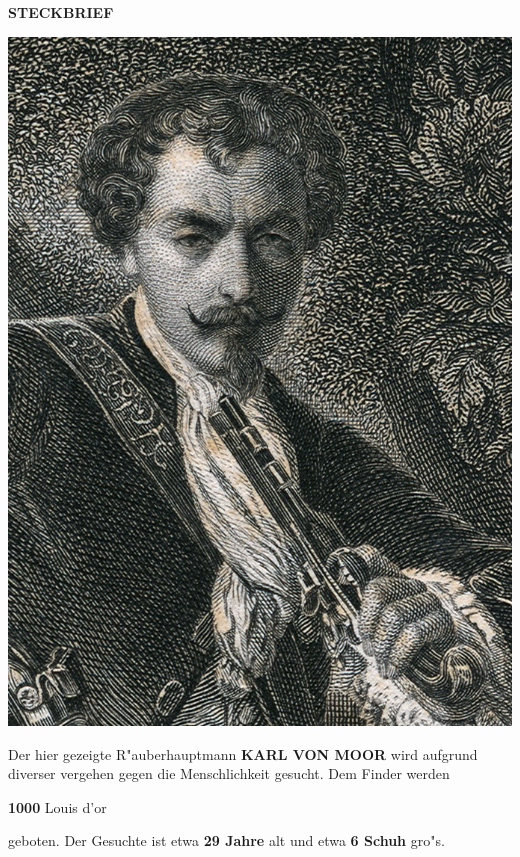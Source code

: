 \begin{center}
\begin{huge}
\textbf{\uppercase{Steckbrief}}
\end{huge}
\end{center}

\begin{center}
\includegraphics[scale=2.5]{karl}
\end{center}

\begin{center}
Der hier gezeigte  R"auberhauptmann \textbf{\uppercase{Karl von Moor}} wird aufgrund diverser vergehen gegen die Menschlichkeit gesucht. Dem Finder werden
\end{center}

\begin{center}
\begin{huge}
\textbf{1000} Louis d'or
\end{huge}
\end{center}

\begin{center}
geboten. Der Gesuchte ist etwa \textbf{29 Jahre} alt und etwa \textbf{6 Schuh} gro"s.
\end{center}
